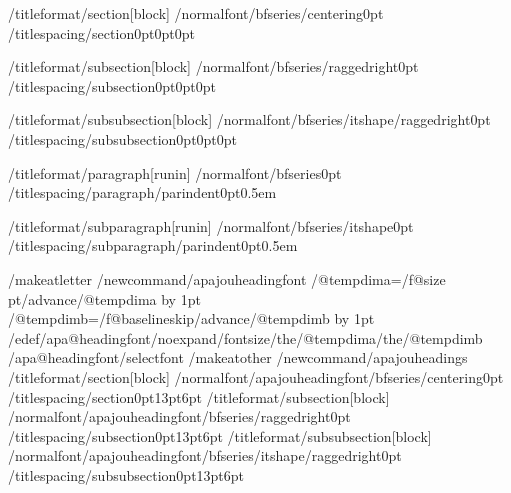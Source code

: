 /titleformat{/section}[block]
  {/normalfont/bfseries/centering}{}{0pt}{}
/titlespacing{/section}{0pt}{0pt}{0pt}

/titleformat{/subsection}[block]
  {/normalfont/bfseries/raggedright}{}{0pt}{}
/titlespacing{/subsection}{0pt}{0pt}{0pt}

/titleformat{/subsubsection}[block]
  {/normalfont/bfseries/itshape/raggedright}{}{0pt}{}
/titlespacing{/subsubsection}{0pt}{0pt}{0pt}

/titleformat{/paragraph}[runin]
  {/normalfont/bfseries}{}{0pt}{}
/titlespacing{/paragraph}{/parindent}{0pt}{0.5em}

/titleformat{/subparagraph}[runin]
  {/normalfont/bfseries/itshape}{}{0pt}{}
/titlespacing{/subparagraph}{/parindent}{0pt}{0.5em}

/makeatletter
/newcommand{/apajouheadingfont}{%
  /@tempdima=/f@size pt/advance/@tempdima by 1pt
  /@tempdimb=/f@baselineskip/advance/@tempdimb by 1pt
  /edef/apa@headingfont{/noexpand/fontsize{/the/@tempdima}{/the/@tempdimb}}%
  /apa@headingfont/selectfont}
/makeatother
/newcommand{/apajouheadings}{%
  /titleformat{/section}[block]
    {/normalfont/apajouheadingfont/bfseries/centering}{}{0pt}{}%
  /titlespacing{/section}{0pt}{13pt}{6pt}%
  /titleformat{/subsection}[block]
    {/normalfont/apajouheadingfont/bfseries/raggedright}{}{0pt}{}%
  /titlespacing{/subsection}{0pt}{13pt}{6pt}%
  /titleformat{/subsubsection}[block]
    {/normalfont/apajouheadingfont/bfseries/itshape/raggedright}{}{0pt}{}%
  /titlespacing{/subsubsection}{0pt}{13pt}{6pt}}

